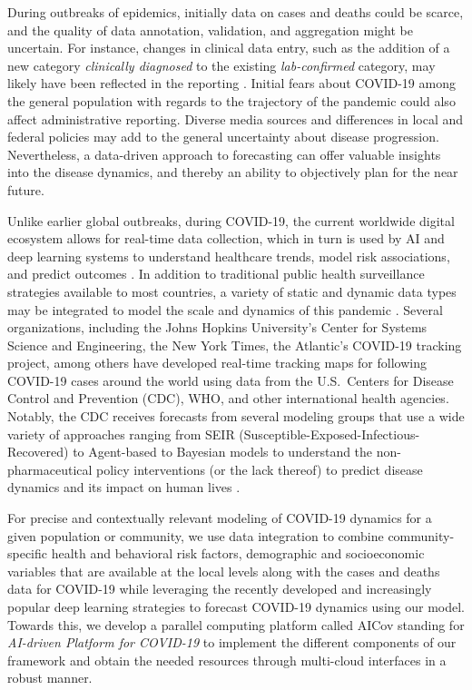 \documentclass[12pt]{article}
\theoremstyle{definition}
\renewcommand{\_}{%
    \textunderscore\hspace{0pt}%
}
\begin{document}
During outbreaks of epidemics, initially data on cases and deaths could be scarce, and the quality of data annotation, validation, and aggregation might be uncertain. For instance, changes in clinical data entry, such as the addition of a new category {\em clinically diagnosed} to the existing {\em lab-confirmed} category, may likely have been reflected in the reporting \cite{Petropoulos2020-hh}. Initial fears about COVID-19 among the general population with regards to the trajectory of the pandemic could also affect administrative reporting. Diverse media sources and differences in local and federal policies may add to the general uncertainty about disease progression. Nevertheless, a data-driven approach to forecasting can offer valuable insights into the disease dynamics, and thereby an ability to objectively plan for the near future. 

Unlike earlier global outbreaks, during COVID-19, the current worldwide digital ecosystem allows for real-time data collection, which in turn is used by AI and deep learning systems to understand healthcare trends, model risk associations, and predict outcomes \cite{Ting2020-lw}. 
In addition to traditional public health surveillance strategies available to most countries, a variety of static and dynamic data types may be integrated to model the scale and dynamics of this pandemic \cite{Pyne2015-ao}. Several organizations, including the Johns Hopkins University’s Center for Systems Science and Engineering, the New York Times, the Atlantic’s COVID-19 tracking project, among others have developed real-time tracking maps for following COVID-19 cases around the world using data from the U.S.~Centers for Disease Control and Prevention (CDC), WHO, and other international health agencies. Notably, the CDC receives forecasts from several modeling groups that use a wide variety of approaches ranging from SEIR (Susceptible-Exposed-Infectious-Recovered) to Agent-based to Bayesian models to understand the non-pharmaceutical policy interventions (or the lack thereof) to predict disease dynamics and its impact on human lives \cite{www-cdc-modeling-forecast}.

For precise and contextually relevant modeling of COVID-19 dynamics for a given population or community, we use data integration to combine community-specific health and behavioral risk factors, demographic and socioeconomic variables that are available at the local levels along with the cases and deaths data for COVID-19 while leveraging the recently developed and increasingly popular deep learning strategies to forecast COVID-19 dynamics using our model. Towards this, we develop a parallel computing platform called AICov standing for  {\em AI-driven Platform for COVID-19} to implement the different components of our framework and obtain the needed resources through multi-cloud interfaces in a robust manner. 
\end{document}
